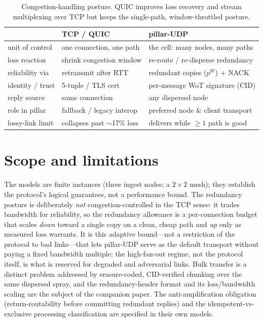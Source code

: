 \documentclass[10pt,twocolumn]{article}
\begin{document}
\begin{table}[t]
\centering\small
\begin{tabular}{@{}p{}p{}p{}@{}}
\toprule
 & TCP / QUIC & pillar-UDP \\
\midrule
unit of control & one connection, one path & the cell: many nodes, many paths \\
loss reaction & shrink congestion window & re-route / re-disperse redundancy \\
reliability via & retransmit after RTT & redundant copies ($p^{W}$) + NACK \\
identity / trust & 5-tuple / TLS cert & per-message WoT signature (CID) \\
reply source & same connection & any dispersed node \\
role in pillar & fallback / legacy interop & preferred node \& client transport \\
lossy-link limit & collapses past $\sim$17\% loss \cite{grayson} & delivers while $\ge 1$ path is good \\
\bottomrule
\end{tabular}
\caption{Congestion-handling posture. QUIC improves loss recovery and stream
multiplexing over TCP but keeps the single-path, window-throttled posture.}
\label{tab:contrast}
\end{table}

\section{Scope and limitations}
The models are finite instances (three ingest nodes; a $2{\times}2$ mesh); they
establish the protocol's logical guarantees, not a performance bound. The
redundancy posture is deliberately \emph{not} congestion-controlled in the TCP
sense: it trades bandwidth for reliability, so the redundancy allowance is a
per-connection budget that scales \emph{down} toward a single copy on a clean,
cheap path and \emph{up} only as measured loss warrants. It is this adaptive
bound---not a restriction of the protocol to bad links---that lets pillar-UDP
serve as the default transport without paying a fixed bandwidth multiple; the
high-fan-out regime, not the protocol itself, is what is reserved for degraded
and adversarial links. Bulk transfer is a distinct problem addressed by
erasure-coded, CID-verified chunking over the same dispersed spray, and the
redundancy-header format and its loss/bandwidth scaling are the subject of the
companion paper. The anti-amplification obligation (return-routability before
committing redundant replies) and the idempotent-vs-exclusive processing
classification are specified in their own models.
\end{document}
